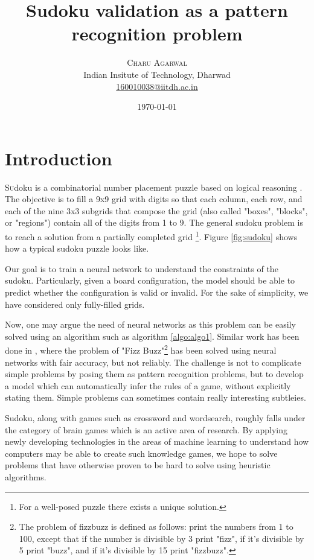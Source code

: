 \documentclass[twoside]{article}
\title{Sudoku validation as a pattern recognition problem} %
\author{%
\textsc{Charu Agarwal} \\[1ex] %
\normalsize Indian Insitute of Technology, Dharwad \\ %
\normalsize \href{mailto:160010038@iitdh.ac.in}{160010038@iitdh.ac.in} %
}
\date{\today} %
\begin{document}
\maketitle


\section{Introduction}

\lettrine[nindent=0em,lines=3]{S} udoku is a combinatorial \cite{lawler} number placement puzzle based on logical reasoning \cite{arnoldy}. The objective is to fill a 9x9 grid with digits so that each column, each row, and each of the nine 3x3 subgrids that compose the grid (also called "boxes", "blocks", or "regions") contain all of the digits from 1 to 9. The general sudoku problem is to reach a solution from a partially completed grid \footnote{For a well-posed puzzle there exists a unique solution.}. Figure \ref{fig:sudoku} shows how a typical sudoku puzzle looks like.

Our goal is to train a neural network to understand the constraints of the sudoku. Particularly, given a board configuration, the model should be able to predict whether the configuration is valid or invalid. For the sake of simplicity, we have considered only fully-filled grids.

Now, one may argue the need of neural networks as this problem can be easily solved using an algorithm such as algorithm \ref{algo:algo1}. Similar work has been done in \cite{fizzbuzz}, where the problem of "Fizz Buzz"\footnote{The problem of fizzbuzz is defined as follows: print the numbers from 1 to 100, except that if the number is divisible by 3 print "fizz", if it's divisible by 5 print "buzz", and if it's divisible by 15 print "fizzbuzz".} has been solved using neural networks with fair accuracy, but not reliably. The challenge is not to complicate simple problems by posing them as pattern recognition problems, but to develop a model which can automatically infer the rules of a game, without explicitly stating them. Simple problems can sometimes contain really interesting subtleies.

Sudoku, along with games such as crossword and wordsearch, roughly falls under the category of brain games which is an active area of research. By applying newly developing technologies in the areas of machine learning to understand how computers may be able to create such knowledge games, we hope to solve problems that have otherwise proven to be hard to solve using heuristic algorithms.
\end{document}
